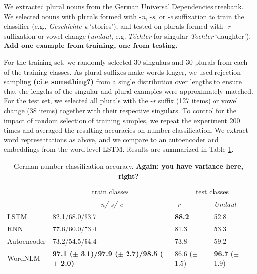 We extracted plural nouns from the German Universal Dependencies
treebank\cite{de2006generating,mcdonald2013universal}.  We selected
nouns with plurals formed with -\emph{n}, -\emph{s}, or -\emph{e}
suffixation to train the classifier (e.g., \emph{Geschichte-n} `stories'), and tested on plurals formed with
-\emph{r} suffixation or vowel change (\emph{umlaut}, e.g. \emph{T{\"o}chter} for singular \emph{Tochter} `daughter'). \textbf{Add one
  example from training, one from testing.}

For the training set, we randomly selected 30 singulars and 30 plurals
from each of the training classes.  As plural suffixes make words
longer, we used rejection sampling \textbf{(cite something?)} from a
single distribution over lengths to ensure that the lengths of the
singular and plural examples were approximately matched.  For the test
set, we selected all plurals with the -\emph{r} suffix (127 items) or vowel change (38 items)
together with their respective singulars. %
To
control for the impact of random selection of training samples, we
repeat the experiment 200 times and averaged the resulting accuracies
on number classification.  We extract word representations as above,
and we compare to an autoencoder and embeddings from the word-level
LSTM. Results are summarized in Table \ref{tab:number-results}.


\begin{table}[t]
  \begin{center}
    \begin{tabular}{l|l|l|l}
      &\multicolumn{1}{c}{train classes}&\multicolumn{2}{|c}{test classes}\\
      &\multicolumn{1}{c}{\emph{-n/-s/-e}}&\emph{-r}&\emph{Umlaut}\\      \hline
      LSTM& 82.1/68.0/83.7  & \textbf{88.2} & 52.8 \\
      RNN& 77.6/60.0/73.4 & 81.3 & 53.3\\
      Autoencoder& 73.2/54.5/64.4 & 73.8 & 59.2\\
	    WordNLM& \textbf{97.1 ($\pm$ 3.1)/97.9 ($\pm$ 2.7)/98.5 ($\pm$ 2.0)} & 86.6 ($\pm$ 1.5) & \textbf{96.7} ($\pm$ 1.9)  \\ %
    \end{tabular}
  \end{center}
  \caption{\label{tab:number-results} German number classification accuracy. \textbf{Again: you have variance here, right?}}
\end{table}

